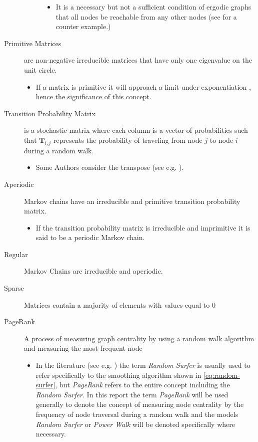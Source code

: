 \documentclass[11pt, twoside]{report}
\begin{document}
\begin{description}
\begin{description}
\begin{itemize}
\item It is a necessary but not a sufficient condition of ergodic graphs that all nodes be reachable from any other nodes (see \cite{sazProbabilityTheoryThis} for a counter example.)
\end{itemize}
\end{description}
\item[{Primitive Matrices}] are non-negative irreducible matrices that have only one eigenvalue on the unit circle.
\begin{itemize}
\item If a matrix is primitive it will approach a limit under exponentiation \cite[]{langvilleGooglePageRankScience2012}, hence the significance of this concept.
\end{itemize}
\item[{Transition Probability Matrix}] is a stochastic matrix where each column is a vector of probabilities such that \(\mathbf{T}_{i,j}\) represents the probability of traveling from node \(j\) to node \(i\) during a random walk.
\begin{itemize}
\item Some Authors consider the transpose (see e.g. \cite{langvilleGooglePageRankScience2012}).
\end{itemize}
\item[{Aperiodic}] Markov chains have an irreducible and primitive transition probability matrix.
\begin{itemize}
\item If the transition probability matrix is irreducible and imprimitive it is said to be a periodic Markov chain.
\end{itemize}
\item[{Regular}] Markov Chains are irreducible and aperiodic.
\item[{Sparse}] Matrices contain a majority of elements with values equal to 0 \cite[]{langvilleGooglePageRankScience2012}
\item[{PageRank}] A process of measuring graph centrality by using a random walk algorithm and measuring the most frequent node
\begin{itemize}
\item In the literature (see e.g.
\cite{guptaWTFWhoFollow2013,langvilleGooglePageRankScience2012}) the term \emph{Random
Surfer} is usually used to refer specifically to the smoothing
algorithm shown in \eqref{eq:random-surfer}, but \emph{PageRank} refers to the entire concept including the \emph{Random Surfer}. In this report the term \emph{PageRank} will be used generally to denote the concept of measuring node centrality by the frequency of node traversal during a random walk and the models \emph{Random Surfer} or \emph{Power Walk} will be denoted specifically where necessary.
\end{itemize}
\end{description}
\end{document}
